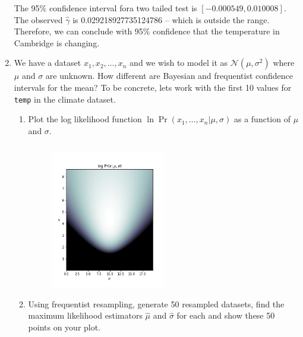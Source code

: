 \documentclass[10pt,\jkfside,a4paper]{article}
\begin{document}
\begin{enumerate}
The 95\% confidence interval fora  two tailed test is
$[-0.000549, 0.010008]$. The observed $\hat{\gamma}$ is 0.029218927735124786
-- which is outside the range. Therefore, we can conclude with 95\%
confidence that the temperature in Cambridge is changing.

\item We have a dataset $x_1, x_2, \dots, x_n$ and we wish to model it as
$\mathcal{N}(\mu, \sigma^2)$ where $\mu$ and $\sigma$ are unknown. How
different are Bayesian and frequentist confidence intervals for the mean? To
be concrete, lets work with the first 10 values for \texttt{temp} in the
climate dataset.

\begin{enumerate}

\item Plot the log likelihood function $\ln\Pr(x_1, \dots, x_n | \mu,
\sigma)$ as a function of $\mu$ and $\sigma$.

\begin{lstlisting}[language=Python]

\end{lstlisting}

\begin{figure}[H]
\centering
\includegraphics[width=0.5\textwidth]{./q13_a_logPr}
\end{figure}

\item Using frequentist resampling, generate 50 resampled datasets, find
the maximum likelihood estimators $\hat{\mu}$ and $\hat{\sigma}$ for each
and show these 50 points on your plot.


\end{enumerate}
\end{enumerate}
\end{document}
